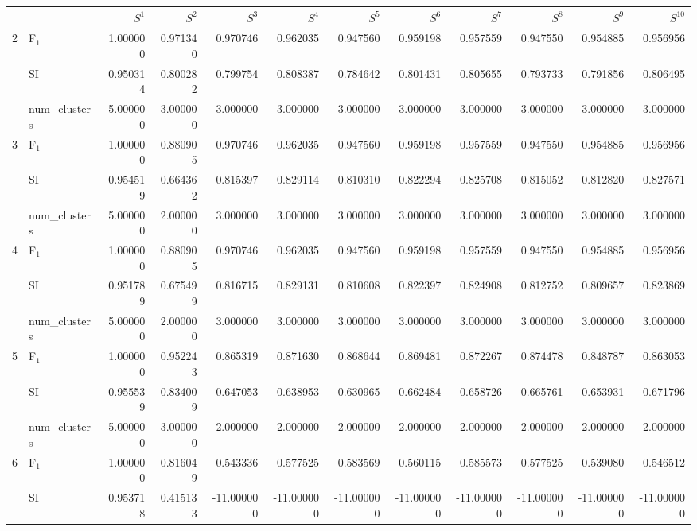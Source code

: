 \begin{tabular}{llrrrrrrrrrr}
\toprule
 &  & $S^{1}$ & $S^{2}$ & $S^{3}$ & $S^{4}$ & $S^{5}$ & $S^{6}$ & $S^{7}$ & $S^{8}$ & $S^{9}$ & $S^{10}$ \\
\midrule
\multirow[c]{3}{*}{2} & F$_1$ & 1.000000 & 0.971340 & 0.970746 & 0.962035 & 0.947560 & 0.959198 & 0.957559 & 0.947550 & 0.954885 & 0.956956 \\
 & SI & 0.950314 & 0.800282 & 0.799754 & 0.808387 & 0.784642 & 0.801431 & 0.805655 & 0.793733 & 0.791856 & 0.806495 \\
 & num_clusters & 5.000000 & 3.000000 & 3.000000 & 3.000000 & 3.000000 & 3.000000 & 3.000000 & 3.000000 & 3.000000 & 3.000000 \\
\multirow[c]{3}{*}{3} & F$_1$ & 1.000000 & 0.880905 & 0.970746 & 0.962035 & 0.947560 & 0.959198 & 0.957559 & 0.947550 & 0.954885 & 0.956956 \\
 & SI & 0.954519 & 0.664362 & 0.815397 & 0.829114 & 0.810310 & 0.822294 & 0.825708 & 0.815052 & 0.812820 & 0.827571 \\
 & num_clusters & 5.000000 & 2.000000 & 3.000000 & 3.000000 & 3.000000 & 3.000000 & 3.000000 & 3.000000 & 3.000000 & 3.000000 \\
\multirow[c]{3}{*}{4} & F$_1$ & 1.000000 & 0.880905 & 0.970746 & 0.962035 & 0.947560 & 0.959198 & 0.957559 & 0.947550 & 0.954885 & 0.956956 \\
 & SI & 0.951789 & 0.675499 & 0.816715 & 0.829131 & 0.810608 & 0.822397 & 0.824908 & 0.812752 & 0.809657 & 0.823869 \\
 & num_clusters & 5.000000 & 2.000000 & 3.000000 & 3.000000 & 3.000000 & 3.000000 & 3.000000 & 3.000000 & 3.000000 & 3.000000 \\
\multirow[c]{3}{*}{5} & F$_1$ & 1.000000 & 0.952243 & 0.865319 & 0.871630 & 0.868644 & 0.869481 & 0.872267 & 0.874478 & 0.848787 & 0.863053 \\
 & SI & 0.955539 & 0.834009 & 0.647053 & 0.638953 & 0.630965 & 0.662484 & 0.658726 & 0.665761 & 0.653931 & 0.671796 \\
 & num_clusters & 5.000000 & 3.000000 & 2.000000 & 2.000000 & 2.000000 & 2.000000 & 2.000000 & 2.000000 & 2.000000 & 2.000000 \\
\multirow[c]{3}{*}{6} & F$_1$ & 1.000000 & 0.816049 & 0.543336 & 0.577525 & 0.583569 & 0.560115 & 0.585573 & 0.577525 & 0.539080 & 0.546512 \\
 & SI & 0.953718 & 0.415133 & -11.000000 & -11.000000 & -11.000000 & -11.000000 & -11.000000 & -11.000000 & -11.000000 & -11.000000 \\

\end{tabular}
